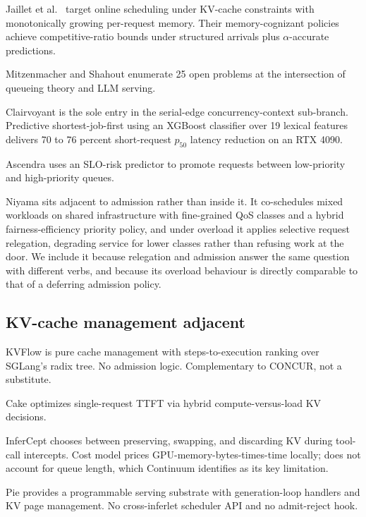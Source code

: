 Jaillet et al.\ \citep{jaillet2026online} target online scheduling
under KV-cache constraints with monotonically growing per-request
memory. Their memory-cognizant policies achieve competitive-ratio
bounds under structured arrivals plus $\alpha$-accurate predictions.

Mitzenmacher and Shahout \citep{mitzenmacher2025queueing} enumerate 25
open problems at the intersection of queueing theory and LLM serving.

Clairvoyant \citep{sundaresan2026clairvoyant} is the sole entry in the
serial-edge concurrency-context sub-branch. Predictive
shortest-job-first using an XGBoost classifier over 19 lexical
features delivers 70 to 76 percent short-request $p_{50}$ latency
reduction on an RTX 4090.

Ascendra \citep{ikram2025ascendra} uses an SLO-risk predictor to
promote requests between low-priority and high-priority queues.

Niyama \citep{goel2025niyama} sits adjacent to admission rather than
inside it. It co-schedules mixed workloads on shared infrastructure with
fine-grained QoS classes and a hybrid fairness-efficiency priority
policy, and under overload it applies selective request relegation,
degrading service for lower classes rather than refusing work at the
door. We include it because relegation and admission answer the same
question with different verbs, and because its overload behaviour is
directly comparable to that of a deferring admission policy.

\subsection{KV-cache management adjacent}

KVFlow \citep{pan2025kvflow} is pure cache management with
steps-to-execution ranking over SGLang's radix tree. No admission
logic. Complementary to CONCUR, not a substitute.

Cake \citep{jin2025cake} optimizes single-request TTFT via hybrid
compute-versus-load KV decisions.

InferCept \citep{abhyankar2024infercept} chooses between preserving,
swapping, and discarding KV during tool-call intercepts. Cost model
prices GPU-memory-bytes-times-time locally; does not account for
queue length, which Continuum identifies as its key limitation.

Pie \citep{gim2025pie} provides a programmable serving substrate with
generation-loop handlers and KV page management. No cross-inferlet
scheduler API and no admit-reject hook.

